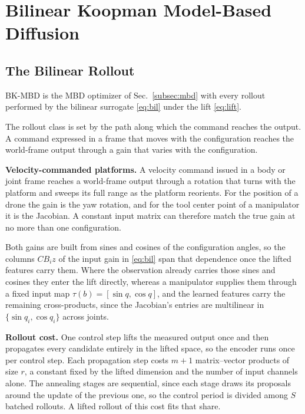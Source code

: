 \documentclass[letterpaper,10pt,conference]{ieeeconf}
\newcommand{\bkmbd}{\textsc{BK-MBD}}
\begin{document}
\section{Bilinear Koopman Model-Based Diffusion}\label{sec:method}

\subsection{The Bilinear Rollout}\label{subsec:rollout}

\bkmbd{} is the MBD optimizer of Sec.~\ref{subsec:mbd} with every rollout performed by the bilinear surrogate \eqref{eq:bil} under the lift \eqref{eq:lift}.

The rollout class is set by the path along which the command reaches the output.
A command expressed in a frame that moves with the configuration reaches the world-frame output through a gain that varies with the configuration.

\textbf{Velocity-commanded platforms.}
A velocity command issued in a body or joint frame reaches a world-frame output through a rotation that turns with the platform and sweeps its full range as the platform reorients.
For the position of a drone the gain is the yaw rotation, and for the tool center point of a manipulator it is the Jacobian.
A constant input matrix can therefore match the true gain at no more than one configuration.

Both gains are built from sines and cosines of the configuration angles, so the columns $C B_i z$ of the input gain in \eqref{eq:bil} span that dependence once the lifted features carry them.
Where the observation already carries those sines and cosines they enter the lift directly, whereas a manipulator supplies them through a fixed input map $\tau(b) = [\sin q, \cos q]$, and the learned features carry the remaining cross-products, since the Jacobian's entries are multilinear in $\{\sin q_i, \cos q_i\}$ across joints.

\textbf{Rollout cost.}
One control step lifts the measured output once and then propagates every candidate entirely in the lifted space, so the encoder runs once per control step.
Each propagation step costs $m+1$ matrix--vector products of size $r$, a constant fixed by the lifted dimension and the number of input channels alone.
The annealing stages are sequential, since each stage draws its proposals around the update of the previous one, so the control period is divided among $S$ batched rollouts.
A lifted rollout of this cost fits that share.
\end{document}
